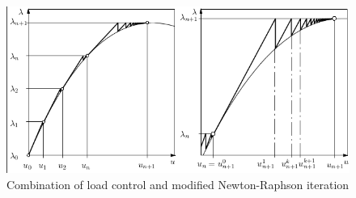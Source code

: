 \begin{figure}[H]
    \centering
    \includegraphics[scale=0.6]{Figure2/Chap3/load control and modified Newton-Raphson.png}
    \caption{Combination of load control and modified Newton-Raphson iteration}
    \label{fig:7.6}
\end{figure}